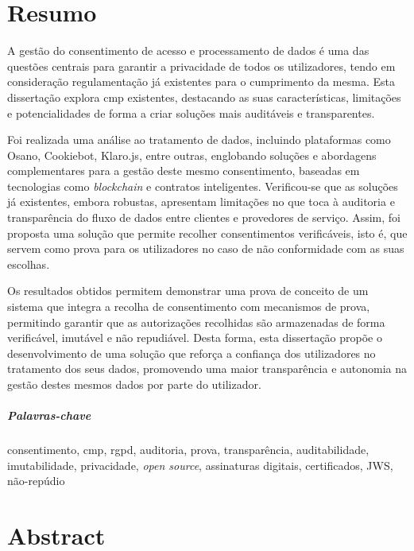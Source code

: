 \chapter*{Resumo}


A gestão do consentimento de acesso e processamento de dados é uma das questões centrais para garantir a privacidade de todos os utilizadores, tendo em consideração regulamentação já existentes para o cumprimento da mesma. Esta dissertação explora \acrfull{cmp} existentes, destacando as suas características, limitações e potencialidades de forma a criar soluções mais auditáveis e transparentes. 

Foi realizada uma análise ao tratamento de dados, incluindo plataformas como Osano, Cookiebot, Klaro.js, entre outras, englobando soluções e abordagens complementares para a gestão deste mesmo consentimento, baseadas em tecnologias como \textit{blockchain} e contratos inteligentes.
Verificou-se que as soluções já existentes, embora robustas, apresentam limitações no que toca à auditoria e transparência do fluxo de dados entre clientes e provedores de serviço. 
Assim, foi proposta uma solução que permite recolher consentimentos verificáveis, isto é, que servem como prova para os utilizadores no caso de não conformidade com as suas escolhas. 

Os resultados obtidos permitem demonstrar uma prova de conceito de um sistema que integra a recolha de consentimento com mecanismos de prova, permitindo garantir que as autorizações recolhidas são armazenadas de forma verificável, imutável e não repudiável. 
Desta forma, esta dissertação propõe o desenvolvimento de uma solução que reforça a confiança dos utilizadores no tratamento dos seus dados, promovendo uma maior transparência e autonomia na gestão destes mesmos dados por parte do utilizador.

\paragraph{Palavras-chave} consentimento, \acrshort{cmp}, \acrshort{rgpd}, auditoria, prova, transparência, auditabilidade, imutabilidade, privacidade, \textit{open source}, assinaturas digitais, certificados, JWS, não-repúdio


\cleardoublepage

\chapter*{Abstract}

